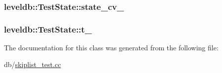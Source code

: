 \hypertarget{classleveldb_1_1_test_state_a57e246c3b9588ae25bc647cf079e2cdd}{
\subsubsection[{state\-\_\-cv\-\_\-}]{ leveldb\-::\-Test\-State\-::state\-\_\-cv\-\_\-\hspace{0.3cm}{\ttfamily [private]}}}\label{classleveldb_1_1_test_state_a57e246c3b9588ae25bc647cf079e2cdd}
\hypertarget{classleveldb_1_1_test_state_a090fd0c59fb141c4843511b4020f05e9}{
\subsubsection[{t\-\_\-}]{ leveldb\-::\-Test\-State\-::t\-\_\-}}\label{classleveldb_1_1_test_state_a090fd0c59fb141c4843511b4020f05e9}


The documentation for this class was generated from the following file\-:\begin{DoxyCompactItemize}
\item 
db/\hyperlink{skiplist__test_8cc}{skiplist\-\_\-test.\-cc}\end{DoxyCompactItemize}
